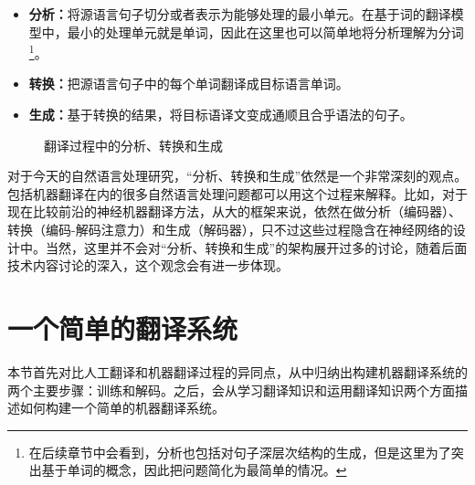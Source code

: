 \begin{itemize}
\vspace{0.5em}
\item {\small\sffamily\bfseries{分析：}}将源语言句子切分或者表示为能够处理的最小单元。在基于词的翻译模型中，最小的处理单元就是单词，因此在这里也可以简单地将分析理解为分词\footnote{在后续章节中会看到，分析也包括对句子深层次结构的生成，但是这里为了突出基于单词的概念，因此把问题简化为最简单的情况。}。
\vspace{0.5em}
\item {\small\sffamily\bfseries{转换：}}把源语言句子中的每个单词翻译成目标语言单词。
\vspace{0.5em}
\item {\small\sffamily\bfseries{生成：}}基于转换的结果，将目标语译文变成通顺且合乎语法的句子。
\vspace{0.5em}
\end{itemize}

\begin{figure}[htp]
 \centering

    \caption{翻译过程中的分析、转换和生成}
    \label{fig:3-2}
\end{figure}

\parinterval 对于今天的自然语言处理研究，``分析、转换和生成''依然是一个非常深刻的观点。包括机器翻译在内的很多自然语言处理问题都可以用这个过程来解释。比如，对于现在比较前沿的神经机器翻译方法，从大的框架来说，依然在做分析（编码器）、转换（编码-解码注意力）和生成（解码器），只不过这些过程隐含在神经网络的设计中。当然，这里并不会对``分析、转换和生成''的架构展开过多的讨论，随着后面技术内容讨论的深入，这个观念会有进一步体现。


\sectionnewpage
\section{一个简单的翻译系统}
\label{sec:simple-mt-example}

\parinterval 本节首先对比人工翻译和机器翻译过程的异同点，从中归纳出构建机器翻译系统的两个主要步骤：训练和解码。之后，会从学习翻译知识和运用翻译知识两个方面描述如何构建一个简单的机器翻译系统。


